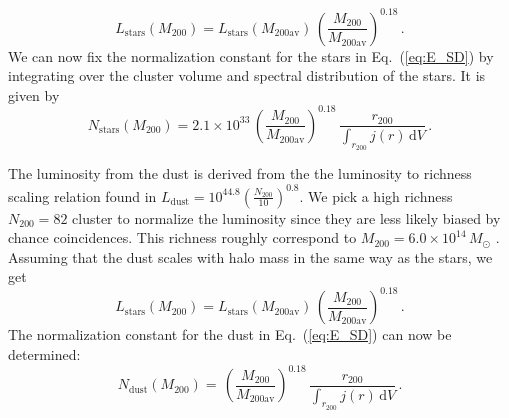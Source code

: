 \documentclass[10pt,aps,pra,reprint,amsmath,amsfonts,amssymb,showpacs]{revtex4-1}
\def\del#1{{}}
\newcommand{\rmn}{\mathrm}
\newcommand{\msun}{M_\odot}
\newcommand{\stars}{\rmn{stars}}
\newcommand{\dust}{\rmn{dust}}
\newcommand{\dd}{\rmn{d}}
\newcommand{\rvir}{r_{200}}
\newcommand{\mvir}{M_{200}}
\begin{document}
\begin{equation}
L_\stars(\mvir)=L_\stars(M_{200\rmn{av}})\,
\left(\frac{\mvir}{M_{200\rmn{av}}}\right)^{0.18}\,.
\end{equation} 
We can now fix the normalization constant for the stars in
Eq.~(\ref{eq:E_SD}) by integrating over the cluster volume and
spectral distribution of the stars. It is given by
\begin{equation}
 N_\stars(\mvir) = 2.1\times10^{33}\,
\left(\frac{\mvir}{M_{200\rmn{av}}}\right)^{0.18}\,
\frac{\rvir}{\int_{\rvir} j(r) \,\dd V}\,.
\label{eq:N_stars}
\end{equation}
\del{Note that since the luminosities include the contribution from
galaxies, we have integrated the spatial distribution including
galaxies to derive the normalization. Once the normalization is fixed,
the SD energy densities are derived from the spatial distribution
where galaxies have been excluded.}

The luminosity from the dust is derived from the the luminosity to
richness scaling relation found in \cite{2008A&A...490..547G}
$L_\dust=10^{44.8}\left(\frac{N_{200}}{10}\right)^{0.8}$. We pick a high
richness $N_{200}=82$ cluster to normalize the luminosity since they
are less likely biased by chance coincidences. This richness roughly
correspond to $\mvir=6.0\times10^{14}\,\msun$
\cite{2010ApJ...713.1037H}. Assuming that the dust scales with halo
mass in the same way as the stars, we get
\begin{equation}
L_\stars(\mvir)=L_\stars(M_{200\rmn{av}})\,
\left(\frac{\mvir}{M_{200\rmn{av}}}\right)^{0.18}\,.
\end{equation} 
The normalization constant for the dust in Eq.~(\ref{eq:E_SD}) can now
be determined:
\begin{equation}
 N_\dust(\mvir) =\,
\left(\frac{\mvir}{M_{200\rmn{av}}}\right)^{0.18}\,
\frac{\rvir}{\int_{\rvir} j(r) \,\dd V}\,.
\label{eq:N_dust}
\end{equation}
\end{document}
